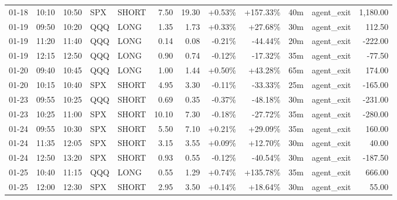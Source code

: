 \documentclass[11pt,a4paper,twoside]{article}
\begin{document}
\begin{center}
\begin{longtable}{>{\color{txtmain}}l l l l l r r r r r >{\color{txtmain}}l r}
01-18 & 10:10 & 10:50 & SPX & SHORT & 7.50 & 19.30 & \textcolor{wingreen}{+0.53\%} & \textcolor{wingreen}{+157.33\%} & 40m & agent\_exit & \textcolor{wingreen}{1,180.00} \\
01-19 & 09:50 & 10:20 & QQQ & LONG & 1.35 & 1.73 & \textcolor{wingreen}{+0.33\%} & \textcolor{wingreen}{+27.68\%} & 30m & agent\_exit & \textcolor{wingreen}{112.50} \\
01-19 & 11:20 & 11:40 & QQQ & LONG & 0.14 & 0.08 & \textcolor{lossred}{-0.21\%} & \textcolor{lossred}{-44.44\%} & 20m & agent\_exit & \textcolor{lossred}{-222.00} \\
01-19 & 12:15 & 12:50 & QQQ & LONG & 0.90 & 0.74 & \textcolor{lossred}{-0.12\%} & \textcolor{lossred}{-17.32\%} & 35m & agent\_exit & \textcolor{lossred}{-77.50} \\
01-20 & 09:40 & 10:45 & QQQ & LONG & 1.00 & 1.44 & \textcolor{wingreen}{+0.50\%} & \textcolor{wingreen}{+43.28\%} & 65m & agent\_exit & \textcolor{wingreen}{174.00} \\
01-20 & 10:15 & 10:40 & SPX & SHORT & 4.95 & 3.30 & \textcolor{lossred}{-0.11\%} & \textcolor{lossred}{-33.33\%} & 25m & agent\_exit & \textcolor{lossred}{-165.00} \\
01-23 & 09:55 & 10:25 & QQQ & SHORT & 0.69 & 0.35 & \textcolor{lossred}{-0.37\%} & \textcolor{lossred}{-48.18\%} & 30m & agent\_exit & \textcolor{lossred}{-231.00} \\
01-23 & 10:25 & 11:00 & SPX & SHORT & 10.10 & 7.30 & \textcolor{lossred}{-0.18\%} & \textcolor{lossred}{-27.72\%} & 35m & agent\_exit & \textcolor{lossred}{-280.00} \\
01-24 & 09:55 & 10:30 & SPX & SHORT & 5.50 & 7.10 & \textcolor{wingreen}{+0.21\%} & \textcolor{wingreen}{+29.09\%} & 35m & agent\_exit & \textcolor{wingreen}{160.00} \\
01-24 & 11:35 & 12:05 & SPX & SHORT & 3.15 & 3.55 & \textcolor{wingreen}{+0.09\%} & \textcolor{wingreen}{+12.70\%} & 30m & agent\_exit & \textcolor{wingreen}{40.00} \\
01-24 & 12:50 & 13:20 & SPX & SHORT & 0.93 & 0.55 & \textcolor{lossred}{-0.12\%} & \textcolor{lossred}{-40.54\%} & 30m & agent\_exit & \textcolor{lossred}{-187.50} \\
01-25 & 10:40 & 11:15 & QQQ & LONG & 0.55 & 1.29 & \textcolor{wingreen}{+0.74\%} & \textcolor{wingreen}{+135.78\%} & 35m & agent\_exit & \textcolor{wingreen}{666.00} \\
01-25 & 12:00 & 12:30 & SPX & SHORT & 2.95 & 3.50 & \textcolor{wingreen}{+0.14\%} & \textcolor{wingreen}{+18.64\%} & 30m & agent\_exit & \textcolor{wingreen}{55.00} \\

\end{longtable}
\end{center}
\end{document}
